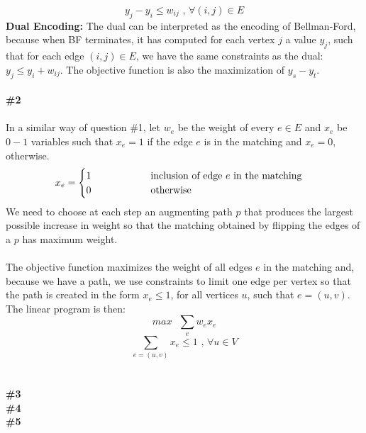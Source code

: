 \documentclass{article}
\newcommand\tab[1][1cm]{\hspace*{#1}}
\begin{document}
$$
y_j - y_i \leq w_{ij} \text{ , } \forall (i,j) \in E
$$
\textbf{Dual Encoding:}
The dual can be interpreted as the encoding of Bellman-Ford, because when BF terminates, it has computed for each vertex $j$ a value $y_j$, such that for each edge $(i,j) \in E$, we have the same constraints as the dual: $y_j \leq y_i + w_{ij}$. The objective function is also the maximization of $y_s - y_t$.
\\
\\
\textbf{\#2}
\\
\\
In a similar way of question \#1, let $w_e$ be the weight of every $e \in E$ and $x_e$ be $0-1$ variables such that $x_e = 1$ if the edge $e$ is in the matching and $x_e = 0$, otherwise. 
\begin{gather*}
x_e =
\begin{cases}
1 \tab\tab\text{ inclusion of edge } e \text{ in the matching} \\
0 \tab\tab\text{ otherwise}\\
\end{cases}
\end{gather*}
We need to choose at each step an augmenting path $p$ that produces the largest possible increase in weight so that the matching obtained by flipping the edges of a $p$ has maximum weight.
\\
\\
The objective function maximizes the weight of all edges $e$ in the matching and, because we have a path, we use constraints to limit one edge per vertex so that the path is created in the form $x_e \leq 1$, for all vertices $u$, such that $e=(u, v)$. The linear program is then:
$$
max \text{ } \sum_e w_e x_e
$$
$$
\sum_{e=(u,v)} x_e \leq 1 \text{ , } \forall u \in V
$$
\\
\\
\textbf{\#3}
\\

\textbf{\#4}
\\
\textbf{\#5}
\\
\end{document}
